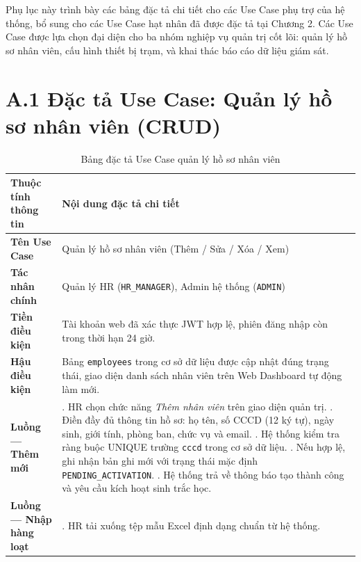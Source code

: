 \documentclass[../DoAn.tex]{subfiles}
\begin{document}
Phụ lục này trình bày các bảng đặc tả chi tiết cho các Use Case phụ trợ của hệ thống, bổ sung cho các Use Case hạt nhân đã được đặc tả tại Chương 2. Các Use Case được lựa chọn đại diện cho ba nhóm nghiệp vụ quản trị cốt lõi: quản lý hồ sơ nhân viên, cấu hình thiết bị trạm, và khai thác báo cáo dữ liệu giám sát.

\section*{A.1 Đặc tả Use Case: Quản lý hồ sơ nhân viên (CRUD)}
\label{appendix:uc_employee}

\begin{table}[ht!]
\centering
\small
\renewcommand{\arraystretch}{1.3}
\caption{Bảng đặc tả Use Case quản lý hồ sơ nhân viên}
\label{tab:uc_employee_crud}
\begin{tabular}{|>{\raggedright\arraybackslash}p{3.5cm}|>{\raggedright\arraybackslash}p{10.1cm}|}
\hline
\textbf{Thuộc tính thông tin} & \textbf{Nội dung đặc tả chi tiết} \\ \hline
\textbf{Tên Use Case} & Quản lý hồ sơ nhân viên (Thêm / Sửa / Xóa / Xem) \\ \hline
\textbf{Tác nhân chính} & Quản lý HR (\texttt{HR\_MANAGER}), Admin hệ thống (\texttt{ADMIN}) \\ \hline
\textbf{Tiền điều kiện} & Tài khoản web đã xác thực JWT hợp lệ, phiên đăng nhập còn trong thời hạn 24 giờ. \\ \hline
\textbf{Hậu điều kiện} & Bảng \texttt{employees} trong cơ sở dữ liệu được cập nhật đúng trạng thái, giao diện danh sách nhân viên trên Web Dashboard tự động làm mới. \\ \hline
\textbf{Luồng — Thêm mới} &
1. HR chọn chức năng \textit{Thêm nhân viên} trên giao diện quản trị. \newline
2. Điền đầy đủ thông tin hồ sơ: họ tên, số CCCD (12 ký tự), ngày sinh, giới tính, phòng ban, chức vụ và email. \newline
3. Hệ thống kiểm tra ràng buộc UNIQUE trường \texttt{cccd} trong cơ sở dữ liệu. \newline
4. Nếu hợp lệ, ghi nhận bản ghi mới với trạng thái mặc định \texttt{PENDING\_ACTIVATION}. \newline
5. Hệ thống trả về thông báo tạo thành công và yêu cầu kích hoạt sinh trắc học. \\ \hline
\textbf{Luồng — Nhập hàng loạt} &
1. HR tải xuống tệp mẫu Excel định dạng chuẩn từ hệ thống. \newline

\end{tabular}
\end{table}
\end{document}
